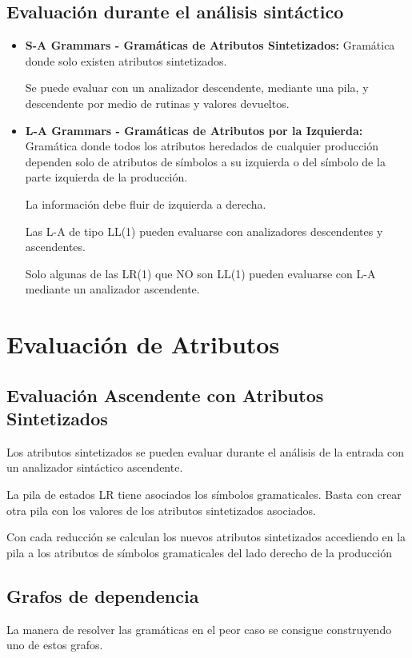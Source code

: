 \documentclass[12pt]{report} %
\begin{document}
\subsection{Evaluación durante el análisis sintáctico}
\begin{itemize}
  \item \textbf{S-A Grammars - Gramáticas de Atributos Sintetizados:} Gramática donde solo existen atributos sintetizados.
  
  Se puede evaluar con un analizador descendente, mediante una pila, y descendente por medio de rutinas y valores devueltos.
  \item \textbf{L-A Grammars - Gramáticas de Atributos por la Izquierda:} Gramática donde todos los atributos heredados de cualquier producción dependen solo de atributos de símbolos a su izquierda o del símbolo de la parte izquierda de la producción.
  
  La información debe fluir de izquierda a derecha.

  Las L-A de tipo LL(1) pueden evaluarse con analizadores descendentes y ascendentes.

  Solo algunas de las LR(1) que NO son LL(1) pueden evaluarse con L-A mediante un analizador ascendente.
\end{itemize}
\pagebreak
\section{Evaluación de Atributos}
\subsection{Evaluación Ascendente con Atributos Sintetizados}
Los atributos sintetizados se pueden evaluar durante el análisis de la entrada con un analizador sintáctico ascendente.

La pila de estados LR tiene asociados los símbolos gramaticales.
Basta con crear otra pila con los valores de los atributos sintetizados asociados.

Con cada reducción se calculan los nuevos atributos sintetizados accediendo en la pila a los atributos de símbolos gramaticales del lado derecho de la producción

\subsection{Grafos de dependencia}
La manera de resolver las gramáticas en el peor caso se consigue construyendo uno de estos grafos.
\end{document}
